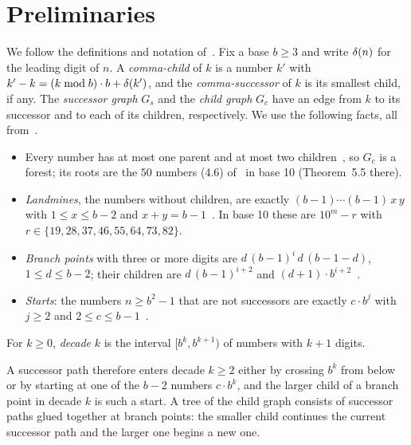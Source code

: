\section{Preliminaries}
\label{sec:preliminaries}

We follow the definitions and notation of~\cite{comma}. Fix a base $b \ge 3$ and write $\delta(n)$
for the leading digit of $n$. A \emph{comma-child} of $k$ is a number $k'$ with
$k' - k = (k \bmod b) \cdot b + \delta(k')$, and the \emph{comma-successor} of $k$ is its smallest
child, if any. The \emph{successor graph} $G_s$ and the \emph{child graph} $G_c$ have an edge from
$k$ to its successor and to each of its children, respectively. We use the following facts, all
from~\cite{comma}.

\begin{itemize}
  \item Every number has at most one parent and at most two children~\cite[\S2, Lemma~5.3]{comma},
        so $G_c$ is a forest; its roots are the $50$ numbers (4.6) of~\cite{comma} in base 10
        (Theorem~5.5 there).
  \item \emph{Landmines}, the numbers without children, are exactly $(b-1)\cdots(b-1)\,x\,y$ with
        $1 \le x \le b-2$ and $x + y = b - 1$~\cite[Theorem~5.1]{comma}. In base 10 these are
        $10^m - r$ with $r \in \{19, 28, 37, 46, 55, 64, 73, 82\}$.
  \item \emph{Branch points} with three or more digits are $d\,(b-1)^i\,d\,(b-1-d)$,
        $1 \le d \le b-2$; their children are $d\,(b-1)^{i+2}$ and
        $(d+1) \cdot b^{i+2}$~\cite[Theorem~5.2]{comma}.
  \item \emph{Starts}: the numbers $n \ge b^2 - 1$ that are not successors are exactly
        $c \cdot b^j$ with $j \ge 2$ and $2 \le c \le b-1$~\cite[Theorem~5.4]{comma}.
\end{itemize}

\begin{definition}
  For $k \ge 0$, \emph{decade} $k$ is the interval $[b^k, b^{k+1})$ of numbers with $k + 1$ digits.
\end{definition}

A successor path therefore enters decade $k \ge 2$ either by crossing $b^k$ from below or by starting
at one of the $b - 2$ numbers $c \cdot b^k$, and the larger child of a branch point in decade $k$ is
such a start. A tree of the child graph consists of successor paths glued together at branch
points: the smaller child continues the current successor path and the larger one begins a new one.

